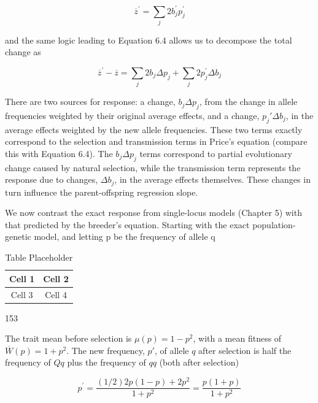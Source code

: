 \documentclass{article}
\begin{document}
\begin{equation}
\overline{z}^{\prime}=\sum_{j}2b_{j}^{\prime}p_{j}^{\prime}
\tag{6.15c}
\label{eq:6_15c}
\end{equation}

and the same logic leading to Equation 6.4 allows us to decompose the total change as

\begin{equation}
\overline{z}^{\prime}-\overline{z}=\sum_{j}2b_{j}\Delta p_{j}+\sum_{j}2p_{j}^{\prime}\Delta b_{j}
\tag{6.15d}
\label{eq:6_15d}
\end{equation}

There are two sources for response: a change,  $ b_j \Delta p_j $, from the change in allele frequencies weighted by their original average effects, and a change,  $ p_j' \Delta b_j $, in the average effects weighted by the new allele frequencies. These two terms exactly correspond to the selection and transmission terms in Price's equation (compare this with Equation 6.4). The  $ b_j \Delta p_j $ terms correspond to partial evolutionary change caused by natural selection, while the transmission term represents the response due to changes,  $ \Delta b_j $, in the average effects themselves. These changes in turn influence the parent-offspring regression slope.

We now contrast the exact response from single-locus models (Chapter 5) with that predicted by the breeder’s equation. Starting with the exact population-genetic model, and letting p be the frequency of allele q

\begin{table}[h]
\centering
\begin{tabular}{|c|c|}
\hline
Cell 1 & Cell 2 \\
\hline
Cell 3 & Cell 4 \\
\hline
\end{tabular}
\caption{Table Placeholder}
\end{table}

153

The trait mean before selection is  $ \mu(p) = 1 - p^2 $, with a mean fitness of  $ \overline{W}(p) = 1 + p^2 $. The new frequency,  $ p' $, of allele  $ q $ after selection is half the frequency of  $ Qq $ plus the frequency of  $ qq $ (both after selection)

\begin{equation}
p^{\prime}=\frac{(1/2)2p(1-p)+2p^{2}}{1+p^{2}}=\frac{p(1+p)}{1+p^{2}}
\tag{6.16a}
\label{eq:6_16a}
\end{equation}
\end{document}

